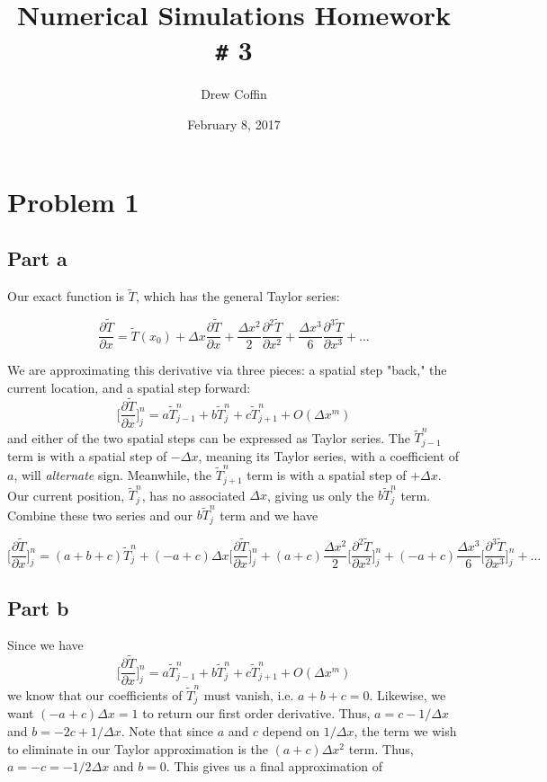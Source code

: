 \documentclass[11pt]{article} %
\title{Numerical Simulations Homework \texttt{\#} 3}
\author{Drew Coffin}
\date{February 8, 2017}
\begin{document}
\maketitle

\section{Problem 1}

\subsection{Part a}
Our exact function is $\widetilde{T}$, which has the general Taylor series:

\[ \frac{\partial \widetilde{T}}{\partial x} = \widetilde{T}(x_0) + \Delta x \frac{\partial \widetilde{T}}{\partial x} + \frac{\Delta x^2}{2} \frac{\partial^2 \widetilde{T}}{\partial x^2} + \frac{\Delta x^3}{6} \frac{\partial^3 \widetilde{T}}{\partial x^3} + ... \]

We are approximating this derivative via three pieces: a spatial step "back," the current location, and a spatial step forward:
\[ \bigg[ \frac{\partial \widetilde{T}}{\partial x} \bigg]^n_j = a \widetilde{T}^n_{j-1} + b \widetilde{T}^n_j + c \widetilde{T}^n_{j+1} + O(\Delta x^m)\]
and either of the two spatial steps can be expressed as Taylor series. The $\widetilde{T}^n_{j-1}$ term is with a spatial step of $-\Delta x$, meaning its Taylor series, with a coefficient of $a$, will \textit{alternate} sign. Meanwhile, the $\widetilde{T}^n_{j+1}$ term is with a spatial step of $+ \Delta x$. Our current position, $\widetilde{T}^n_j$, has no associated $\Delta x$, giving us only the $b \widetilde{T}^n_j $ term. Combine these two series and our $b \widetilde{T}^n_j$ term and we have

\[ \bigg[ \frac{\partial \widetilde{T}}{\partial x} \bigg]^n_j = (a +b+c) \widetilde{T}^n_j + (-a+c) \Delta x \bigg[ \frac{\partial \widetilde{T}}{\partial x}\bigg]^n_j + (a+c) \frac{\Delta x^2}{2} \bigg[ \frac{\partial^2 \widetilde{T}}{\partial x^2}\bigg]^n_j + (-a+c) \frac{\Delta x^3}{6} \bigg[ \frac{\partial^3 \widetilde{T}}{\partial x^3}\bigg]^n_j + ... \]

\subsection{Part b}
Since we have
\[ \bigg[ \frac{\partial \widetilde{T}}{\partial x} \bigg]^n_j = a \widetilde{T}^n_{j-1} + b \widetilde{T}^n_j + c \widetilde{T}^n_{j+1} + O(\Delta x^m)\]
we know that our coefficients of $\widetilde{T}^n_j$ must vanish, i.e. $a+b+c = 0$. Likewise, we want $(-a+c) \Delta x = 1$ to return our first order derivative. Thus, $a = c - 1/\Delta x$ and $b = -2c + 1/\Delta x$. Note that since $a$ and $c$ depend on $1/\Delta x$, the term we wish to eliminate in our Taylor approximation is the $(a+c) \Delta x^2$ term. Thus, $a = -c =-1/2 \Delta x$ and $b = 0$. This gives us a final approximation of
\end{document}
